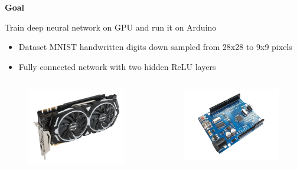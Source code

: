\documentclass[xcolor=dvipsnames]{beamer}
\begin{document}
\begin{frame}{\bf Goal}

Train deep neural network on GPU and run it on Arduino

\begin{itemize}
  \item Dataset MNIST handwritten digits down sampled from 28x28 to 9x9 pixels
  \item Fully connected network with two hidden ReLU layers
\end{itemize}


\begin{columns}
\begin{column}{0.5\textwidth}

  \begin{figure}
    \includegraphics[scale=0.15]{gpu.png}
  \end{figure}

\end{column}
\begin{column}{0.5\textwidth}  %

  \begin{figure}
  \includegraphics[scale=0.1]{arduino.png}
  \end{figure}


\end{column}
\end{columns}
\end{frame}
\end{document}
